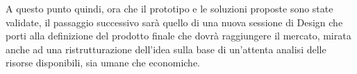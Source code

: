 A questo punto quindi, ora che il prototipo e le soluzioni proposte sono state validate, il passaggio successivo sarà quello di una nuova sessione di Design che porti alla definizione del prodotto finale che dovrà raggiungere il mercato, mirata anche ad una ristrutturazione dell’idea sulla base di un’attenta analisi delle risorse disponibili, sia umane che economiche. 


\newpage